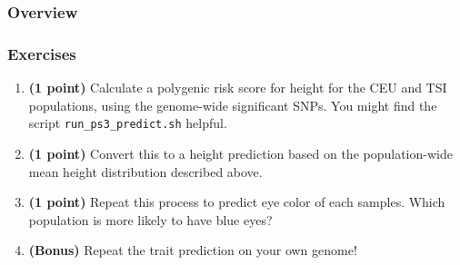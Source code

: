 \documentclass[12pt]{article}
\begin{document}
\subsubsection*{Overview}


\subsubsection*{Exercises}
\begin{enumerate}
\item \textbf{(1 point)} Calculate a polygenic risk score for height for the CEU and TSI populations, using the genome-wide significant SNPs. You might find the script \texttt{run\_ps3\_predict.sh} helpful.

\item \textbf{(1 point)} Convert this to a height prediction based on the population-wide mean height distribution described above.

\item \textbf{(1 point)} Repeat this process to predict eye color of each samples. Which population is more likely to have blue eyes?

\item \textbf{(Bonus)} Repeat the trait prediction on your own genome!
\end{enumerate}
\end{document}
